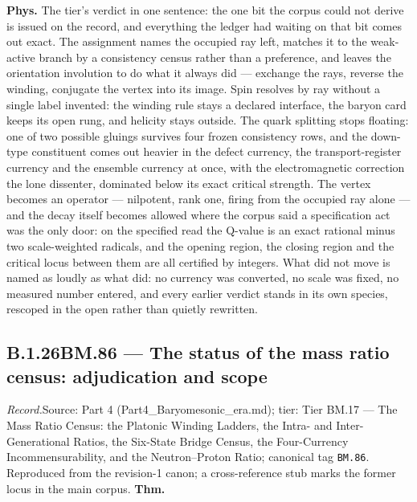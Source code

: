 \documentclass[11pt,openany]{report}
\theoremstyle{canonplain}
\theoremstyle{canondef}
\begin{document}
\textbf{Phys.} The tier's verdict in one sentence: the one bit the corpus could not derive is issued on the record, and everything the ledger had waiting on that bit comes out exact. The assignment names the occupied ray left, matches it to the weak-active branch by a consistency census rather than a preference, and leaves the orientation involution to do what it always did — exchange the rays, reverse the winding, conjugate the vertex into its image. Spin resolves by ray without a single label invented: the winding rule stays a declared interface, the baryon card keeps its open rung, and helicity stays outside. The quark splitting stops floating: one of two possible gluings survives four frozen consistency rows, and the down-type constituent comes out heavier in the defect currency, the transport-register currency and the ensemble currency at once, with the electromagnetic correction the lone dissenter, dominated below its exact critical strength. The vertex becomes an operator — nilpotent, rank one, firing from the occupied ray alone — and the decay itself becomes allowed where the corpus said a specification act was the only door: on the specified read the Q-value is an exact rational minus two scale-weighted radicals, and the opening region, the closing region and the critical locus between them are all certified by integers. What did not move is named as loudly as what did: no currency was converted, no scale was fixed, no measured number entered, and every earlier verdict stands in its own species, rescoped in the open rather than quietly rewritten.

\medskip
\subsection*{\texorpdfstring{B.1.26\quad BM.86 — The status of the mass ratio census: adjudication and scope}{BM.86 B.1.26}}
\label{tag:BM-86}
{\small \textit{Record.}\quad Source: Part 4 (Part4\_Baryomesonic\_era.md); tier: Tier BM.17 — The Mass Ratio Census: the Platonic Winding Ladders, the Intra- and Inter-Generational Ratios, the Six-State Bridge Census, the Four-Currency Incommensurability, and the Neutron–Proton Ratio; canonical tag \texttt{BM.86}. Reproduced from the revision-1 canon; a cross-reference stub marks the former locus in the main corpus.}
\medskip
\textbf{Thm.}
\end{document}
